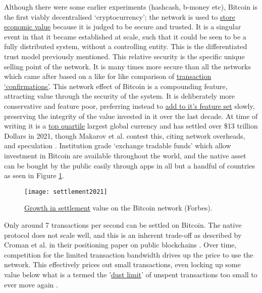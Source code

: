Although there were some earlier experiments (hashcash, b-money etc), Bitcoin is the first viably decentralised `cryptocurrency'; the network is used to \href{https://www.aier.org/article/why-does-bitcoin-have-value/}{store economic value} because it is judged to be secure and trusted. It is a singular event in that it became established at scale, such that it could be seen to be a fully distributed system, without a controlling entity. This is the differentiated trust model previously mentioned. This relative security is the specific unique selling point of the network. It is many times more secure than all the networks which came after based on a like for like comparison of \href{https://howmanyconfs.com/}{transaction `confirmations'}. This network effect of Bitcoin is a compounding feature, attracting value through the security of the system. It is deliberately more conservative and feature poor, preferring instead to \href{https://bips.xyz/}{add to it's feature set} slowly, preserving the integrity of the value invested in it over the last decade. At time of writing it is a \href{https://fiatmarketcap.com/}{top quartile} largest global currency and has settled over \$13 trillion Dollars in 2021, though Makarov et al. contest this, citing network overheads, and speculation \cite{makarov2021blockchain}. Institution grade `exchange tradable funds' which allow investment in Bitcoin are available throughout the world, and the native asset can be bought by the public easily through apps in all but a handful of countries as seen in Figure \ref{fig:settled2021}. \par
\begin{figure}
  \centering
    \texttt{[image: settlement2021]}
  \caption{\href{https://twitter.com/glxyresearch/status/1469039427028664320?}{Growth in settlement} value on the Bitcoin network (Forbes).}
  \label{fig:settled2021}
\end{figure}
Only around 7 transactions per second can be settled on Bitcoin. The native protocol does not scale well, and this is an inherent trade-off as described by Croman et al. in their positioning paper on public blockchains \cite{croman2016scaling}. Over time, competition for the limited transaction bandwidth drives up the price to use the network. This effectively prices out small transactions, even locking up some value below what is a termed the '\href{https://github.com/bitcoin/bitcoin/blob/v0.10.0rc3/src/primitives/transaction.h#L137}{dust limit}' of unspent transactions too small to ever move again \cite{delgado2018analysis}. \par
